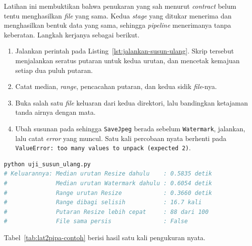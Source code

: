 Latihan ini membuktikan bahwa penukaran yang sah menurut \textit{contract} belum tentu
menghasilkan \textit{file} yang sama. Kedua \textit{stage} yang ditukar menerima dan
menghasilkan bentuk data yang sama, sehingga \textit{pipeline} menerimanya tanpa keberatan.
Langkah kerjanya sebagai berikut.

\begin{enumerate}
  \item Jalankan perintah pada Listing~\ref{lst:jalankan-susun-ulang}. Skrip
    tersebut menjalankan seratus putaran untuk kedua urutan, dan mencetak
    kemajuan setiap dua puluh putaran.
  \item Catat median, \textit{range}, pencacahan putaran, dan kedua sidik
    \textit{file}-nya.
  \item Buka salah satu \textit{file} keluaran dari kedua direktori, lalu
    bandingkan ketajaman tanda airnya dengan mata.
  \item Ubah susunan pada  sehingga
    \texttt{SaveJpeg} berada sebelum \texttt{Watermark}, jalankan, lalu catat
    \textit{error} yang muncul. Satu kali percobaan nyata berhenti pada
    \texttt{ValueError: too many values to unpack (expected 2)}.
\end{enumerate}

\begin{lstlisting}[language=bash, caption={Mengukur akibat \textit{stage
  reordering}, skrip tersedia di
  \berkas{sources/chapter06/uji_susun_ulang.py}}, label=lst:jalankan-susun-ulang]
python uji_susun_ulang.py
# Keluarannya: Median urutan Resize dahulu    : 0.5835 detik
#              Median urutan Watermark dahulu : 0.6054 detik
#              Range urutan Resize            : 0.3660 detik
#              Range dibagi selisih           : 16.7 kali
#              Putaran Resize lebih cepat     : 88 dari 100
#              File sama persis               : False
\end{lstlisting}

Tabel~\ref{tab:lat2pipa-contoh} berisi hasil satu kali pengukuran nyata.

